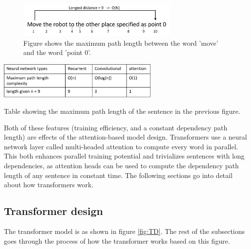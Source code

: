 \begin{figure}[ht]
    \centering
    \includegraphics[width=8cm]{img/dependency_path_length.png}
    \caption{Figure shows the maximum path length between the word 'move' and the word 'point 0'.}
    \label{fig:path_length}
\end{figure}

\begin{table}[ht]
    \centering
    \includegraphics[width=8cm]{img/path_complexity.png}
    \caption{Table showing the maximum path length of the sentence in the previous figure.}
    \label{table:path_length_complexity}
\end{table}

Both of these features (training efficiency, and a constant dependency path length) are effects of the attention-based model design. Transformers use a neural network layer called multi-headed attention to compute every word in parallel. This both enhances parallel training potential and trivializes sentences with long dependencies, as attention heads can be used to compute the dependency path length of any sentence in constant time. The following sections go into detail about how transformers work.


\subsection{Transformer design}\label{subsec:TD}
The transformer model is as shown in figure \ref{fig:TD}. The rest of the subsections goes through the process of how the transformer works based on this figure.
 
